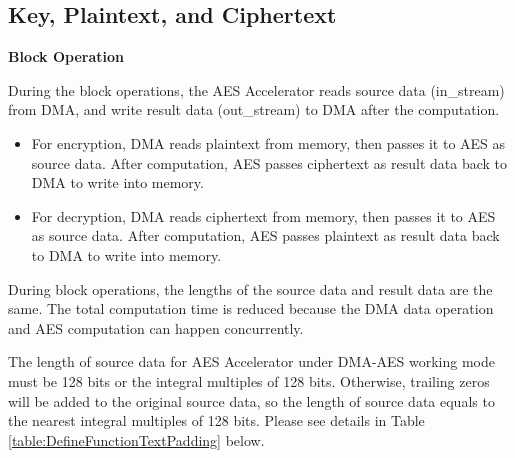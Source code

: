 \documentclass[main\_\_EN.tex]{subfiles}
\begin{document}

\subsection{Key, Plaintext, and Ciphertext}

\textbf{Block Operation}

During the block operations, the AES Accelerator reads source data (in\_stream) from DMA, and write result data (out\_stream) to DMA after the computation.

\begin{itemize}
    \item For encryption, DMA reads plaintext from memory, then passes it to AES as source data. After computation, AES passes ciphertext as result data  back to DMA to write into memory.
    \item For decryption, DMA reads ciphertext from memory, then passes it to AES as source data. After computation, AES passes plaintext as result data back to DMA to write into memory.
\end{itemize}

During block operations, the lengths of the source data and result data are the same. The total computation time is reduced because the DMA data operation and AES computation can happen concurrently.

\label{api:testpadding}The length of source data for AES Accelerator under DMA-AES working mode must be 128 bits or the integral multiples of 128 bits. Otherwise, trailing zeros will be added to the original source data, so the length of source data equals to the nearest integral multiples of 128 bits. Please see details in Table \ref{table:DefineFunctionTextPadding} below.

\end{document}
